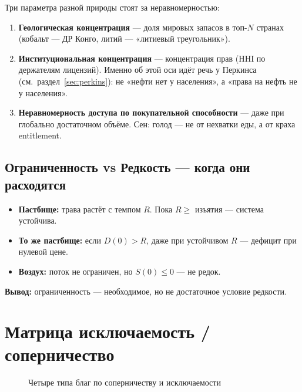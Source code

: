 \documentclass[11pt]{article}
\begin{document}
Три параметра разной природы стоят за неравномерностью:
\begin{enumerate}
\item \textbf{Геологическая концентрация} — доля мировых запасов в топ-$N$ странах (кобальт — ДР Конго, литий — «литиевый треугольник»).
\item \textbf{Институциональная концентрация} — концентрация прав (HHI по держателям лицензий). Именно об этой оси идёт речь у Перкинса (см.\ раздел~\ref{sec:perkins}): не «нефти нет у населения», а «права на нефть не у населения».
\item \textbf{Неравномерность доступа по покупательной способности} — даже при глобально достаточном объёме. Сен: голод — не от нехватки еды, а от краха entitlement.
\end{enumerate}

\subsection{Ограниченность vs Редкость — когда они расходятся}
\begin{itemize}
\item \textbf{Пастбище:} трава растёт с темпом $R$. Пока $R \ge$ изъятия — система устойчива.
\item \textbf{То же пастбище:} если $D(0) > R$, даже при устойчивом $R$ — дефицит при нулевой цене.
\item \textbf{Воздух:} поток не ограничен, но $S(0) \le 0$ — не редок.
\end{itemize}
\textbf{Вывод:} ограниченность — необходимое, но не достаточное условие редкости.

\section{Матрица исключаемость / соперничество}

\begin{figure}[h]
\centering
{}
\caption{Четыре типа благ по соперничеству и исключаемости}
\end{figure}
\end{document}
